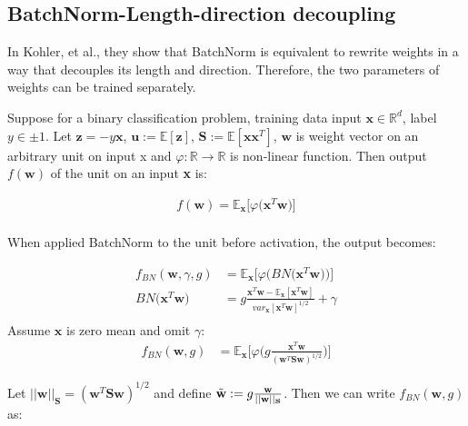 \documentclass{article}
\begin{document}

\subsection{BatchNorm-Length-direction decoupling}

In Kohler, et al., they show that BatchNorm is equivalent to rewrite weights in a way that decouples its length and direction. Therefore, the two parameters of weights can be trained separately.

Suppose for a binary classification problem, training data input $\textbf{x}\in\mathbb{R}^d$, label $y\in{\pm1}$. Let $\textbf{z}=-y\textbf{x}$, $\textbf{u}:=\mathbb{E}[\textbf{z}]$, $\textbf{S}:=\mathbb{E}[\textbf{xx}^T]$, $\textbf{w}$ is weight vector on an arbitrary unit on input x and $\varphi: \mathbb{R}\xrightarrow{}\mathbb{R}$ is non-linear function. Then output $f(\textbf{w})$ of the unit on an input \textbf{x} is:

\begin{align*}
	f(\textbf{w})=\mathbb{E}_{\textbf{x}}\big[\varphi\big(\textbf{x}^T\textbf{w}\big)\big]\\
\end{align*}

When applied BatchNorm to the unit before activation, the output becomes:

\begin{align*}
	f_{BN}(\textbf{w},\gamma,g)&=\mathbb{E}_{\textbf{x}}\big[\varphi\big(BN\big(\textbf{x}^T\textbf{w}\big)\big)\big]\\
	BN\big(\textbf{x}^T\textbf{w}\big)&=g\frac{\textbf{x}^T\textbf{w}-\mathbb{E}_{\textbf{x}}[\textbf{x}^T\textbf{w}]}{var_\textbf{x}[\textbf{x}^T\textbf{w}]^{1/2}}+\gamma\\
\end{align*}
Assume $\textbf{x}$ is zero mean and omit $\gamma$:
\begin{align*}
	f_{BN}(\textbf{w},g)&=\mathbb{E}_{\textbf{x}}\Big[\varphi\Big(g\frac{\textbf{x}^T\textbf{w}}{(\textbf{w}^T\textbf{Sw})^{1/2}}\Big)\Big]
\end{align*}

Let $||\textbf{w}||_{\textbf{S}}=(\textbf{w}^T\textbf{Sw})^{1/2}$ and define $\Tilde{\textbf{w}}:=g\frac{\textbf{w}}{||\textbf{w}||_{\textbf{S}}}$. Then we can write  $f_{BN}(\textbf{w},g)$ as:
\end{document}
